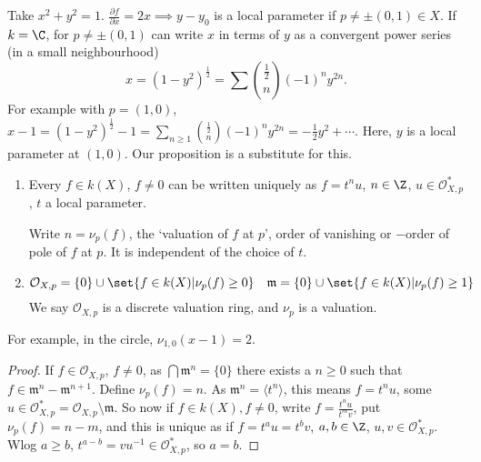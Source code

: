 \documentclass{article}
\begin{document}
\begin{eg}
    Take $x^2 + y^2 = 1$. $\frac{\partial f}{\partial x} = 2x \implies y - y_0$ is a local parameter if $p \neq \pm (0, 1) \in X.$
    If $k = \C$, for $p \neq \pm (0, 1)$ can write $x$ in terms of $y$ as a convergent power series (in a small neighbourhood)
    \begin{equation*}
        x = (1-y^2)^\frac{1}{2} = \sum \binom{\frac{1}{2}}{n} (-1)^n y^{2n}.
    \end{equation*}
    For example with $p=(1, 0)$, $x - 1 = (1-y^2)^\frac{1}{2} - 1 = \sum_{n \geq 1} \binom{\frac{1}{2}}{n} (-1)^n y^{2n} = -\frac{1}{2}y^2 + \dotsb$.
    Here, $y$ is a local parameter at $(1, 0)$.
    Our proposition is a substitute for this.
\end{eg}
\begin{cor}
    \leavevmode
    \begin{enumerate}[label=(\roman*)]
        \item Every $f \in k(X)$, $f \neq 0$ can be written uniquely as $f = t^n u$, $n \in \Z$, $u \in \mathcal{O}_{X, p}^*$, $t$ a local parameter.

            Write $n = \nu_p(f)$, the `valuation of $f$ at $p$', order of vanishing or $-$order of pole of $f$ at $p$.
            It is independent of the choice of $t$.
        \item
            \begin{equation*}
                \mathcal{O}_{X, p} = \{0\} \cup \set{f \in k(X) | \nu_p(f) \geq 0} \quad \mathfrak{m} = \{0\} \cup \set{f \in k(X) | \nu_p(f) \geq 1}
            \end{equation*}
            We say $\mathcal{O}_{X, p}$ is a discrete valuation ring, and $\nu_p$ is a valuation.
    \end{enumerate}
\end{cor}
For example, in the circle, $\nu_{1, 0}(x-1) = 2$.
\begin{proof}
    If $f \in \mathcal{O}_{X, p}$, $f \neq 0$, as $\bigcap \mathfrak{m}^n = \{0\}$ there exists a $n \geq 0$ such that $f \in \mathfrak{m}^n - \mathfrak{m}^{n+1}$.
    Define $\nu_p(f) = n$.
    As $\mathfrak{m}^n = \langle t^n \rangle$, this means $f = t^n u$, some $u \in \mathcal{O}_{X, p}^* = \mathcal{O}_{X, p} \setminus \mathfrak{m}$.
    So now if $f \in k(X), f \neq0$, write $f = \frac{t^n u}{t^m v}$, put $\nu_p(f) = n-m$, and this is unique as if $f = t^a u = t^b v$, $a, b \in \Z$, $u, v \in \mathcal{O}_{X, p}^*$.
    Wlog $a \geq b$, $t^{a-b} = v u^{-1} \in \mathcal{O}_{X, p}^*$, so $a = b$.
\end{proof}
\end{document}
